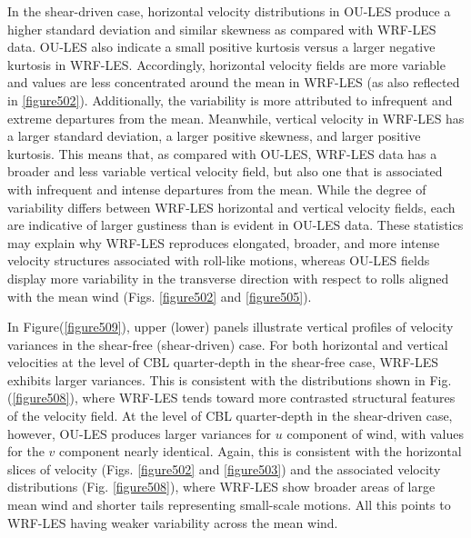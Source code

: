 In the shear-driven case, horizontal velocity distributions in OU-LES produce a higher standard deviation and similar skewness as compared with WRF-LES data. OU-LES also indicate a small positive kurtosis versus a larger negative kurtosis in WRF-LES. Accordingly, horizontal velocity fields are more variable and values are less concentrated around the mean in WRF-LES (as also reflected in \autoref{figure502}). Additionally, the variability is more attributed to infrequent and extreme departures from the mean. Meanwhile, vertical velocity in WRF-LES has a larger standard deviation, a larger positive skewness, and larger positive kurtosis. This means that, as compared with OU-LES, WRF-LES data has a broader and less variable vertical velocity field, but also one that is associated with infrequent and intense departures from the mean. While the degree of variability differs between WRF-LES horizontal and vertical velocity fields, each are indicative of larger gustiness than is evident in OU-LES data. These statistics may explain why WRF-LES reproduces elongated, broader, and more intense velocity structures associated with roll-like motions, whereas OU-LES fields display more variability in the transverse direction with respect to rolls aligned with the mean wind (Figs. \autoref{figure502} and \autoref{figure505}).

In Figure(\autoref{figure509}), upper (lower) panels illustrate vertical profiles of velocity variances in the shear-free (shear-driven) case. For both horizontal and vertical velocities at the level of CBL quarter-depth in the shear-free case, WRF-LES exhibits larger variances. This is consistent with the distributions shown in Fig. (\autoref{figure508}), where WRF-LES tends toward more contrasted structural features of the velocity field. At the level of CBL quarter-depth in the shear-driven case, however, OU-LES produces larger variances for $u$ component of wind, with values for the $v$ component nearly identical. Again, this is consistent with the horizontal slices of velocity (Figs. \autoref{figure502} and \autoref{figure503}) and the associated velocity distributions (Fig. \autoref{figure508}), where WRF-LES show broader areas of large mean wind and shorter tails representing small-scale motions. All this points to WRF-LES having weaker variability across the mean wind.


